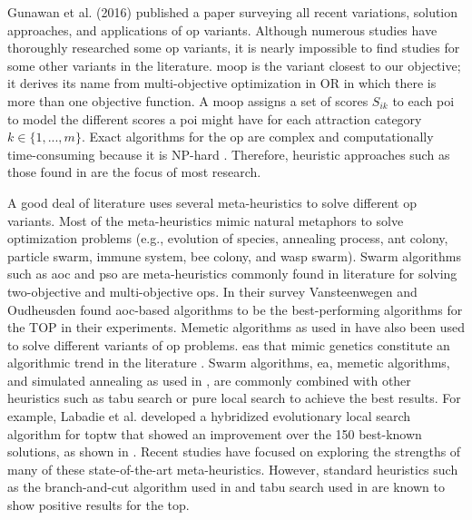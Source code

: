 Gunawan et al. (2016) \parencite{OP_Solution_Gunawan} published a paper surveying all recent variations, solution approaches, and applications of \gls{op} variants. Although numerous studies have thoroughly researched some \gls{op} variants, it is nearly impossible to find studies for some other variants in the literature. \Gls{moop} is the variant closest to our objective; it derives its name from multi-objective optimization in OR in which there is more than one objective function. A \gls{moop} assigns a set of scores $S_{ik}$ to each \gls{poi} to model the different scores a \gls{poi} might have for each attraction category $k \in \{1,...,m\}$. Exact algorithms for the \gls{op} are complex and computationally time-consuming because it is NP-hard \parencite{Golden1987TheProblem}. Therefore, heuristic approaches such as those found in \parencite{T.1984HeuristicOrienteering, Golden1987TheProblem, Ramesh1991AnProblem,Souffriau2008AGuides} are the focus of most research. 

A good deal of literature uses several meta-heuristics to solve different \gls{op} variants. Most of the meta-heuristics mimic natural metaphors to solve optimization problems (e.g., evolution of species, annealing process, ant colony, particle swarm, immune system, bee colony, and wasp swarm). Swarm algorithms such as \Gls{aoc}  \parencite{Ke2008AntsProblem, Wagner2016StealingProblem, Mukhina2019OrienteeringConstruction, Martin-Moreno2018Multi-ObjectiveProblem} and \gls{pso} \parencite{Sevkli2010StPSO:Optimization, Wagner2016StealingProblem, Schilde2009MetaheuristicsProblem} are meta-heuristics commonly found in literature for solving two-objective and multi-objective \glspl{op}. In their survey Vansteenwegen and Oudheusden \parencite{Vansteenwegen2011TheSurvey} found \gls{aoc}-based algorithms to be the best-performing algorithms for the TOP in their experiments. Memetic algorithms as used in \parencite{Lu2018AConstraints,Bouly2010AProblem, Divsalar2014ASelection} have also been used to solve different variants of \gls{op} problems. \Glspl{ea} that mimic genetics constitute an algorithmic trend in the literature \parencite{Wu2018EvolutionaryProblem, Faeda2020AProblem, Kobeaga2018AnProblem}. Swarm algorithms, \gls{ea}, memetic algorithms, and simulated annealing as used in \parencite{Pan2018IndependentTourist}, are commonly combined with other heuristics such as tabu search \parencite{Lu2018AConstraints} or pure local search \parencite{Divsalar2014ASelection, Bouly2010AProblem} to achieve the best results. For example, Labadie et al. \parencite{Labadie2011HybridizedWindows} developed a hybridized evolutionary local search algorithm for \gls{toptw} that showed an improvement over the 150 best-known solutions, as shown in \parencite{OP_Solution_Gunawan}. Recent studies have focused on exploring the strengths of many of these state-of-the-art meta-heuristics. However, standard heuristics such as the branch-and-cut algorithm used in \parencite{Dang2013AProblem} and tabu search used in  \parencite{E.2005AProblem} are known to show positive results for the \gls{top}. 

